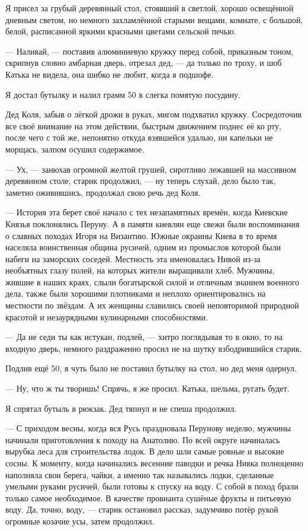 Я присел за грубый деревянный стол, стоявший в светлой, хорошо освещённой
дневным светом, но немного захламлённой старыми вещами, комнате, с большой,
белой, расписанной яркими красными цветами сельской печью.

— Наливай, — поставив алюминиевую кружку перед собой, приказным тоном, скрипнув
словно амбарная дверь, отрезал дед, — да только по троху, и шоб Катька не
видела, она шибко не любит, когда я подшофе.

Я достал бутылку и налил грамм 50 в слегка помятую посудину.

Дед Коля, забыв о лёгкой дрожи в руках, мигом подхватил кружку. Сосредоточив
все своё внимание на этом действии, быстрым движением поднес её ко рту, после
чего с той же, непонятно откуда взявшейся удалью, ни капельки не морщась,
залпом осушил содержимое.

— Ух, — занюхав огромной желтой грушей, сиротливо лежавшей на массивном
деревянном столе, старик продолжил, — ну теперь слухай, дело было так, заметно
оживившись, продолжал свою речь дед Коля.

— История эта берет своё начало с тех незапамятных времён, когда Киевские
Князья поклонялись Перуну. А в памяти киевлян еще свежи были воспоминания о
славных походах Игоря на Византию. Южные окраины Киева в то время населяла
воинственная община русичей, одним из промыслов которой были набеги на
заморских соседей. Местность эта именовалась Нивой из-за необъятных глазу
полей, на которых жители выращивали хлеб. Мужчины, жившие в наших краях, слыли
богатырской силой и отличным знанием военного дела, также были хорошими
плотниками и неплохо ориентировались на местности по звёздам. А их женщины
славились своей неповторимой природной красотой и незаурядными кулинарными
способностями.

— Да не седи ты как истукан, подлей, — хитро поглядывая то в окно, то на
входную дверь, немного раздраженно просил не на шутку взбодрившийся старик.

Подлив ещё 50, я чуть было не поставил бутылку на стол, но дед меня одернул.

— Ну, что ж ты творишь! Спрячь, я же просил. Катька, шельма, ругать будет.

Я спрятал бутыль в рюкзак. Дед тяпнул и не спеша продолжил.

— С приходом весны, когда вся Русь праздновала Перунову неделю, мужчины
начинали приготовления к походу на Анатолию. По всей округе начиналась вырубка
леса для строительства лодок. В дело шли самые ровные и высокие сосны. К
моменту, когда начинались весенние паводки и речка Нивка полноценно наполняла
свои берега, чайки, а именно так назывались лодки, сделанные умелыми руками
русичей, были готовы к спуску на воду. С собой в поход брали только самое
необходимое. В качестве провианта сушёные фрукты и питьевую воду. Да, точно,
воду, — старик остановил рассказ, задумчиво потёр рукой огромные козачие усы,
затем продолжил.

